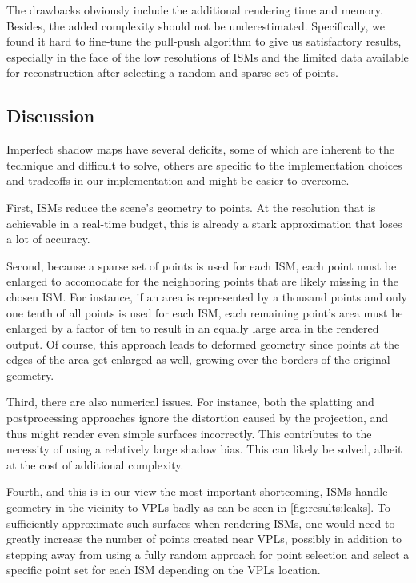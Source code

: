 The drawbacks obviously include the additional rendering time and memory. Besides, the added complexity should not be underestimated. Specifically, we found it hard to fine-tune the pull-push algorithm to give us satisfactory results, especially in the face of the low resolutions of ISMs and the limited data available for reconstruction after selecting a random and sparse set of points.




\subsection{Discussion}
\label{sec:results:ism:discussion}

Imperfect shadow maps have several deficits, some of which are inherent to the technique and difficult to solve, others are specific to the implementation choices and tradeoffs in our implementation and might be easier to overcome.

First, ISMs reduce the scene's geometry to points. At the resolution that is achievable in a real-time budget, this is already a stark approximation that loses a lot of accuracy.

Second, because a sparse set of points is used for each ISM, each point must be enlarged to accomodate for the neighboring points that are likely missing in the chosen ISM. For instance, if an area is represented by a thousand points and only one tenth of all points is used for each ISM, each remaining point's area must be enlarged by a factor of ten to result in an equally large area in the rendered output. Of course, this approach leads to deformed geometry since points at the edges of the area get enlarged as well, growing over the borders of the original geometry.

Third, there are also numerical issues. For instance, both the splatting and postprocessing approaches ignore the distortion caused by the projection, and thus might render even simple surfaces incorrectly. This contributes to the necessity of using a relatively large shadow bias. This can likely be solved, albeit at the cost of additional complexity.

Fourth, and this is in our view the most important shortcoming, ISMs handle geometry in the vicinity to VPLs badly as can be seen in \cref{fig:results:leaks}. To sufficiently approximate such surfaces when rendering ISMs, one would need to greatly increase the number of points created near VPLs, possibly in addition to stepping away from using a fully random approach for point selection and select a specific point set for each ISM depending on the VPLs location.

